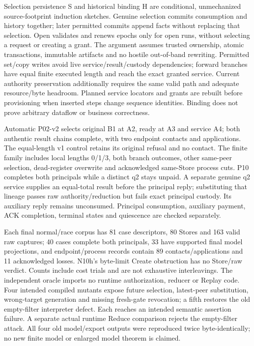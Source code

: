 \documentclass[11pt,a4paper]{article}
\theoremstyle{definition}
\theoremstyle{remark}
\begin{document}
Selection persistence S and historical binding H are conditional, unmechanized source-footprint induction sketches. Genuine selection commits consumption and history together; later permitted commits append facts without replacing that selection. Open validates and renews epochs only for open runs, without selecting a request or creating a grant. The argument assumes trusted ownership, atomic transactions, immutable artifacts and no hostile out-of-band rewriting. Permitted set/copy writes avoid live service/result/custody dependencies; forward branches have equal finite executed length and reach the exact granted service. Current authority preservation additionally requires the same valid path and adequate resource/byte headroom. Planned service locators and grants are rebuilt before provisioning when inserted steps change sequence identities. Binding does not prove arbitrary dataflow or business correctness.

Automatic P02-v2 selects original B1 at A2, ready at A3 and service A4; both authentic result chains complete, with two endpoint contacts and applications. The equal-length v1 control retains its original refusal and no contact. The finite family includes local lengths 0/1/3, both branch outcomes, other same-peer selection, dead-register overwrite and acknowledged same-Store process cuts. P10 completes both principals while a distinct q2 stays unpaid. A separate genuine q2 service supplies an equal-total result before the principal reply; substituting that lineage passes raw authority/reduction but fails exact principal custody. Its auxiliary reply remains unconsumed. Principal consumption, auxiliary payment, ACK completion, terminal states and quiescence are checked separately.

Each final normal/race corpus has 81 case descriptors, 80 Stores and 163 valid raw captures; 40 cases complete both principals, 33 have supported final model projections, and endpoint/process records contain 89 contacts/applications and 11 acknowledged losses. N10h's byte-limit Create obstruction has no Store/raw verdict. Counts include cost trials and are not exhaustive interleavings. The independent oracle imports no runtime authorization, reducer or Replay code. Four intended compiled mutants expose future selection, latest-peer substitution, wrong-target generation and missing fresh-gate revocation; a fifth restores the old empty-filter interpreter defect. Each reaches an intended semantic assertion failure. A separate actual runtime Reduce comparison rejects the empty-filter attack. All four old model/export outputs were reproduced twice byte-identically; no new finite model or enlarged model theorem is claimed.
\end{document}
